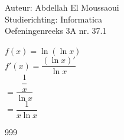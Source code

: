 \documentclass[a4paper]{article}
\begin{document}
  
\noindent \large Auteur: Abdellah El Moussaoui \\
\noindent \large Studierichting: Informatica\\
\noindent \large Oefeningenreeks 3A nr. 37.1\\

\medskip

\normalsize

$f(x)=\ln\left(\ln x\right)$\\

$f'(x)=\dfrac{\left(\ln x\right)'}{\ln x}$\\

$=\dfrac{\dfrac{1}{x}}{\ln x}$\\

$=\dfrac{1}{x\ln x}$\\



\begin{thebibliography}{999}
\end{thebibliography}
\end{document}
